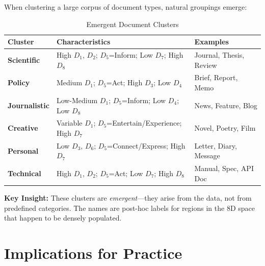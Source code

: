 When clustering a large corpus of document types, natural groupings emerge:

\begin{table}[htbp]
\centering
\caption{Emergent Document Clusters}
\label{tab:clusters}
\renewcommand{\arraystretch}{1.3}
\begin{tabular}{@{}lp{6cm}l@{}}
\toprule
\textbf{Cluster} & \textbf{Characteristics} & \textbf{Examples} \\
\midrule
\textbf{Scientific} &
High $D_1$, $D_2$; $D_5$=Inform; Low $D_7$; High $D_8$ &
Journal, Thesis, Review \\
\textbf{Policy} &
Medium $D_1$; $D_5$=Act; High $D_3$; Low $D_4$ &
Brief, Report, Memo \\
\textbf{Journalistic} &
Low-Medium $D_1$; $D_5$=Inform; Low $D_4$; Low $D_8$ &
News, Feature, Blog \\
\textbf{Creative} &
Variable $D_1$; $D_5$=Entertain/Experience; High $D_7$ &
Novel, Poetry, Film \\
\textbf{Personal} &
Low $D_3$, $D_6$; $D_5$=Connect/Express; High $D_7$ &
Letter, Diary, Message \\
\textbf{Technical} &
High $D_1$, $D_2$; $D_5$=Act; Low $D_7$; High $D_8$ &
Manual, Spec, API Doc \\
\bottomrule
\end{tabular}
\end{table}

\textbf{Key Insight:} These clusters are \textit{emergent}---they arise from
the data, not from predefined categories. The names are post-hoc labels for
regions in the 8D space that happen to be densely populated.


\section{Implications for Practice}
\label{sec:doctype-practice}

